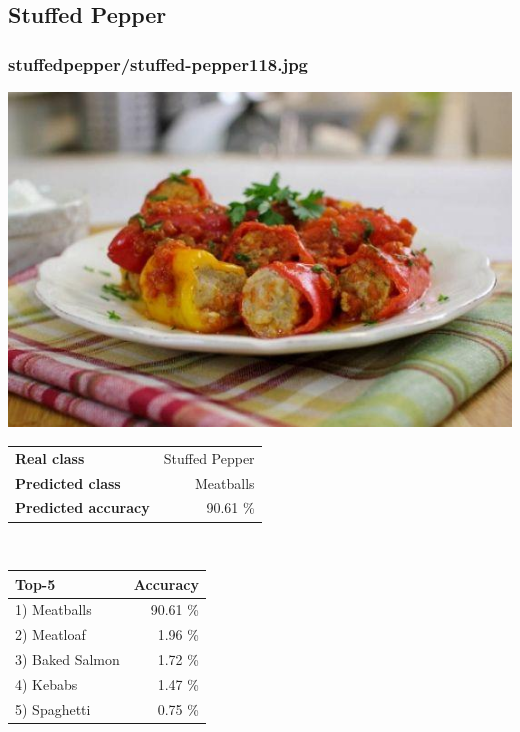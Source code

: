 \subsection{Stuffed Pepper}
    
\subsubsection{stuffed\textunderscore pepper/stuffed-pepper118.jpg}

\begin{minipage}[t]{0.4\textwidth}
	\vspace{0pt}
	\includegraphics[width=\linewidth]{images/evaluation-images/stuffed_pepper/stuffed-pepper118.jpg}
\end{minipage}
\hfill
\begin{minipage}[t]{0.5\textwidth}
	\vspace{0pt}\raggedright
	\begin{tabularx}{\textwidth}{X r}
		\small \textbf{Real class} & \small Stuffed Pepper\\
		\small \textbf{Predicted class} & \small Meatballs\\
		\small \textbf{Predicted accuracy} & \small 90.61 \%
    \end{tabularx}\\
    
    \vspace{6pt}
	\begin{tabularx}{\textwidth}{X r}
        \small \textbf{Top-5} & \small \textbf{Accuracy} \\
        \hline
		\small 1) Meatballs & \small 90.61 \%\\\small 2) Meatloaf & \small 1.96 \%\\\small 3) Baked Salmon & \small 1.72 \%\\\small 4) Kebabs & \small 1.47 \%\\\small 5) Spaghetti & \small 0.75 \%
    \end{tabularx}
\end{minipage}
    
